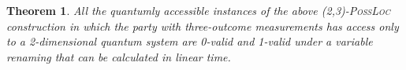 \documentclass[reprint]{revtex4-1}
\newtheorem{thm}{Theorem}
\theoremstyle{definition}
\begin{document}
\begin{thm}
All the quantumly accessible instances of the above \textsc{(2,3)-PossLoc} construction in which the party with three-outcome measurements has access only to a 2-dimensional quantum system are 0-valid and 1-valid under a variable renaming that can be calculated in linear time.

\end{thm}
\end{document}
